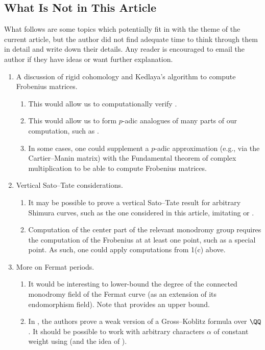 \documentclass[openany]{book}
\begin{document}
\subsection{What Is Not in This Article}
What follows are some topics which potentially fit in with the theme of the current article, but the author did not find adequate time to think through them in detail and write down their details. Any reader is encouraged to email the author if they have ideas or want further explanation.
\begin{enumerate}
	\item A discussion of rigid cohomology and Kedlaya's algorithm to compute Frobenius matrices.
	\begin{enumerate}
		\item This would allow us to computationally verify .
		\item This would allow us to form $p$-adic analogues of many parts of our computation, such as .
		\item In some cases, one could supplement a $p$-adic approximation (e.g., via the Cartier--Manin matrix) with the Fundamental theorem of complex multiplication to be able to compute Frobenius matrices.
	\end{enumerate}
	\item Vertical Sato--Tate considerations.
	\begin{enumerate}
		\item It may be possible to prove a vertical Sato--Tate result for arbitrary Shimura curves, such as the one considered in this article, imitating \cite[Theorem~3.5.3]{deligne-weil-2} or \cite[Theorem~3.6]{katz-monodromy}.
		\item Computation of the center part of the relevant monodromy group requires the computation of the Frobenius at at least one point, such as a special point. As such, one could apply computations from 1(c) above.
	\end{enumerate}
	\item More on Fermat periods.
	\begin{enumerate}
		\item It would be interesting to lower-bound the degree of the connected monodromy field of the Fermat curve (as an extension of its endomorphism field). Note that  provides an upper bound.
		\item In \cite[Theorem~9.3.13]{ggl-fermat}, the authors prove a weak version of a Gross--Koblitz formula over $\QQ$. It should be possible to work with arbitrary characters $\alpha$ of constant weight using  (and the idea of ).
	\end{enumerate}
\end{enumerate}
\end{document}
